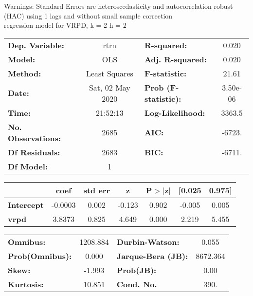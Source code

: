 Warnings: \newline
 [1] Standard Errors are heteroscedasticity and autocorrelation robust (HAC) using 1 lags and without small sample correction\\ 

regression model for VRPD, k = 2 h = 2\begin{center}
\begin{tabular}{lclc}
\toprule
\textbf{Dep. Variable:}    &       rtrn       & \textbf{  R-squared:         } &     0.020   \\
\textbf{Model:}            &       OLS        & \textbf{  Adj. R-squared:    } &     0.020   \\
\textbf{Method:}           &  Least Squares   & \textbf{  F-statistic:       } &     21.61   \\
\textbf{Date:}             & Sat, 02 May 2020 & \textbf{  Prob (F-statistic):} &  3.50e-06   \\
\textbf{Time:}             &     21:52:13     & \textbf{  Log-Likelihood:    } &    3363.5   \\
\textbf{No. Observations:} &        2685      & \textbf{  AIC:               } &    -6723.   \\
\textbf{Df Residuals:}     &        2683      & \textbf{  BIC:               } &    -6711.   \\
\textbf{Df Model:}         &           1      & \textbf{                     } &             \\
\bottomrule
\end{tabular}
\begin{tabular}{lcccccc}
                   & \textbf{coef} & \textbf{std err} & \textbf{z} & \textbf{P$> |$z$|$} & \textbf{[0.025} & \textbf{0.975]}  \\
\midrule
\textbf{Intercept} &      -0.0003  &        0.002     &    -0.123  &         0.902        &       -0.005    &        0.005     \\
\textbf{vrpd}      &       3.8373  &        0.825     &     4.649  &         0.000        &        2.219    &        5.455     \\
\bottomrule
\end{tabular}
\begin{tabular}{lclc}
\textbf{Omnibus:}       & 1208.884 & \textbf{  Durbin-Watson:     } &    0.055  \\
\textbf{Prob(Omnibus):} &   0.000  & \textbf{  Jarque-Bera (JB):  } & 8672.364  \\
\textbf{Skew:}          &  -1.993  & \textbf{  Prob(JB):          } &     0.00  \\
\textbf{Kurtosis:}      &  10.851  & \textbf{  Cond. No.          } &     390.  \\
\bottomrule
\end{tabular}
\end{center}

